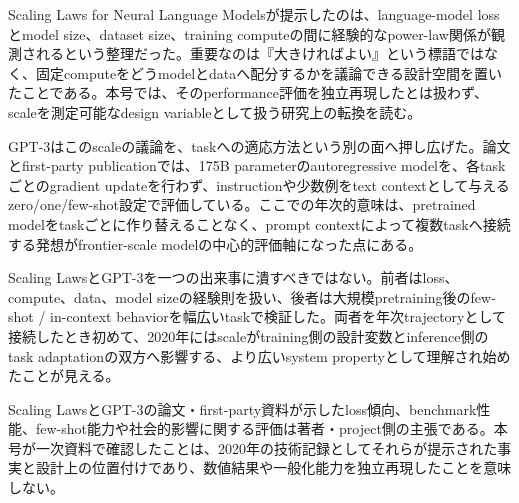 
Scaling Laws for Neural Language Modelsが提示したのは、language-model lossとmodel size、dataset size、training computeの間に経験的なpower-law関係が観測されるという整理だった。重要なのは『大きければよい』という標語ではなく、固定computeをどうmodelとdataへ配分するかを議論できる設計空間を置いたことである。本号では、そのperformance評価を独立再現したとは扱わず、scaleを測定可能なdesign variableとして扱う研究上の転換を読む。\autocite{src-7a3002b6ab1d}


GPT-3はこのscaleの議論を、taskへの適応方法という別の面へ押し広げた。論文とfirst-party publicationでは、175B parameterのautoregressive modelを、各taskごとのgradient updateを行わず、instructionや少数例をtext contextとして与えるzero/one/few-shot設定で評価している。ここでの年次的意味は、pretrained modelをtaskごとに作り替えることなく、prompt contextによって複数taskへ接続する発想がfrontier-scale modelの中心的評価軸になった点にある。\autocite{src-0fc45aa25dc7,src-8f27ffb5bc66}


Scaling LawsとGPT-3を一つの出来事に潰すべきではない。前者はloss、compute、data、model sizeの経験則を扱い、後者は大規模pretraining後のfew-shot / in-context behaviorを幅広いtaskで検証した。両者を年次trajectoryとして接続したとき初めて、2020年にはscaleがtraining側の設計変数とinference側のtask adaptationの双方へ影響する、より広いsystem propertyとして理解され始めたことが見える。\autocite{src-0fc45aa25dc7,src-7a3002b6ab1d,src-8f27ffb5bc66}


\begin{claimboundary}
Scaling LawsとGPT-3の論文・first-party資料が示したloss傾向、benchmark性能、few-shot能力や社会的影響に関する評価は著者・project側の主張である。本号が一次資料で確認したことは、2020年の技術記録としてそれらが提示された事実と設計上の位置付けであり、数値結果や一般化能力を独立再現したことを意味しない。\autocite{src-0fc45aa25dc7,src-7a3002b6ab1d,src-8f27ffb5bc66}
\end{claimboundary}
